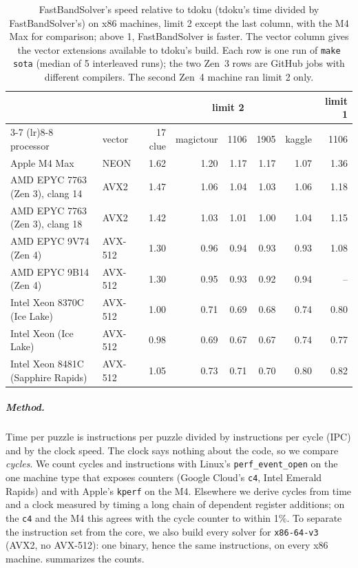 \documentclass[a4paper,USenglish,cleveref,anonymous]{lipics-v2021}
\begin{document}
\begin{table}[t]
\centering
\caption{FastBandSolver's speed relative to tdoku (tdoku's time divided by FastBandSolver's) on x86 machines,
limit 2 except the last column, with the M4 Max for comparison; above 1, FastBandSolver is faster. The vector column
gives the vector extensions available to tdoku's build. Each row is one run of \texttt{make sota} (median of 5
interleaved runs); the two Zen~3 rows are GitHub jobs with different compilers. The second Zen~4 machine ran limit 2
only.}
\label{tab:x86}
\small
\setlength{\tabcolsep}{3.5pt}
\begin{tabular}{llrrrrrr}
\toprule
& & \multicolumn{5}{c}{limit 2} & limit 1 \\
\cmidrule(lr){3-7} \cmidrule(lr){8-8}
processor & vector & 17 clue & magictour & 1106 & 1905 & kaggle & 1106 \\
\midrule
Apple M4 Max & NEON & 1.62 & 1.20 & 1.17 & 1.17 & 1.07 & 1.36 \\
\midrule
AMD EPYC 7763 (Zen 3), clang 14 & AVX2 & 1.47 & 1.06 & 1.04 & 1.03 & 1.06 & 1.18 \\
AMD EPYC 7763 (Zen 3), clang 18 & AVX2 & 1.42 & 1.03 & 1.01 & 1.00 & 1.04 & 1.15 \\
AMD EPYC 9V74 (Zen 4) & AVX-512 & 1.30 & 0.96 & 0.94 & 0.93 & 0.93 & 1.08 \\
AMD EPYC 9B14 (Zen 4) & AVX-512 & 1.30 & 0.95 & 0.93 & 0.92 & 0.94 & -- \\
Intel Xeon 8370C (Ice Lake) & AVX-512 & 1.00 & 0.71 & 0.69 & 0.68 & 0.74 & 0.80 \\
Intel Xeon (Ice Lake) & AVX-512 & 0.98 & 0.69 & 0.67 & 0.67 & 0.74 & 0.77 \\
Intel Xeon 8481C (Sapphire Rapids) & AVX-512 & 1.05 & 0.73 & 0.71 & 0.70 & 0.80 & 0.82 \\
\bottomrule
\end{tabular}
\end{table}

\subparagraph{Method.} Time per puzzle is instructions per puzzle divided by instructions per cycle (IPC) and by the clock
speed. The clock says nothing about the code, so we compare \emph{cycles}. We count cycles and instructions with Linux's
\texttt{perf\_event\_open} on the one machine type that exposes counters (Google Cloud's \texttt{c4}, Intel Emerald
Rapids) and with Apple's \texttt{kperf} on the M4. Elsewhere we derive cycles from time and a clock measured by timing a
long chain of dependent register additions; on the \texttt{c4} and the M4 this agrees with the cycle counter to within
1\%. To separate the instruction set from the core, we also build every solver for \texttt{x86-64-v3} (AVX2, no
AVX-512): one binary, hence the same instructions, on every x86 machine.  summarizes the counts.
\end{document}
